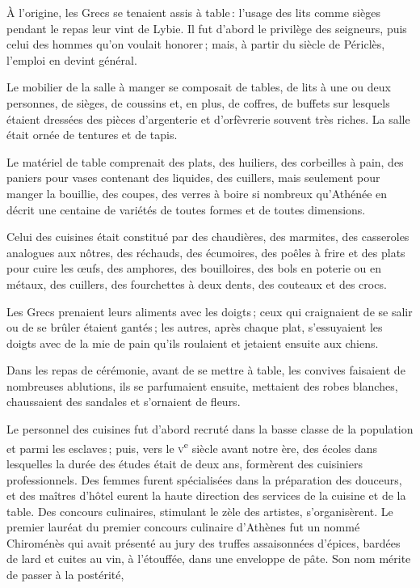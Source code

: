 À l’origine, les Grecs se tenaient assis à table : l'usage des lits comme
sièges pendant le repas leur vint de Lybie. Il fut d’abord le privilège des
seigneurs, puis celui des hommes qu'on voulait honorer ; mais, à partir du
siècle de Périclès, l'emploi en devint général.

Le mobilier de la salle à manger se composait de tables, de lits à une ou deux
personnes, de sièges, de coussins et, en plus, de coffres, de buffets sur
lesquels étaient dressées des pièces d’argenterie et d'orfèvrerie souvent très
riches. La salle était ornée de tentures et de tapis.

Le matériel de table comprenait des plats, des huiliers, des corbeilles à pain,
des paniers pour vases contenant des liquides, des cuillers, mais seulement
pour manger la bouillie, des coupes, des verres à boire si nombreux qu'Athénée
en décrit une centaine de variétés de toutes formes et de toutes dimensions.

Celui des cuisines était constitué par des chaudières, des marmites, des
casseroles analogues aux nôtres, des réchauds, des écumoires, des poêles
à frire et des plats pour cuire les œufs, des amphores, des bouilloires, des
bols en poterie ou en métaux, des cuillers, des fourchettes à deux dents, des
couteaux et des crocs.

Les Grecs prenaient leurs aliments avec les doigts ; ceux qui craignaient de se
salir ou de se brûler étaient gantés ; les autres, après chaque plat,
s'essuyaient les doigts avec de la mie de pain qu'ils roulaient et jetaient
ensuite aux chiens.

Dans les repas de cérémonie, avant de se mettre à table, les convives faisaient de
nombreuses ablutions, ils se parfumaient ensuite, mettaient des robes blanches,
chaussaient des sandales et s'ornaient de fleurs.

Le personnel des cuisines fut d'abord recruté dans la basse classe de la
population et parmi les esclaves ; puis, vers le \textsc{v}\textsuperscript{e}
siècle avant notre ère, des écoles dans lesquelles la durée des études était de
deux ans, formèrent des cuisiniers professionnels. Des femmes furent
spécialisées dans la préparation des douceurs, et des maîtres d'hôtel eurent la
haute direction des services de la cuisine et de la table. Des concours
culinaires, stimulant le zèle des artistes, s'organisèrent. Le premier lauréat
du premier concours culinaire d'Athènes fut un nommé Chiroménès qui avait
présenté au jury des truffes assaisonnées d'épices, bardées de lard et cuites
au vin, à l'étouffée, dans une enveloppe de pâte. Son nom mérite de passer à la
postérité,

